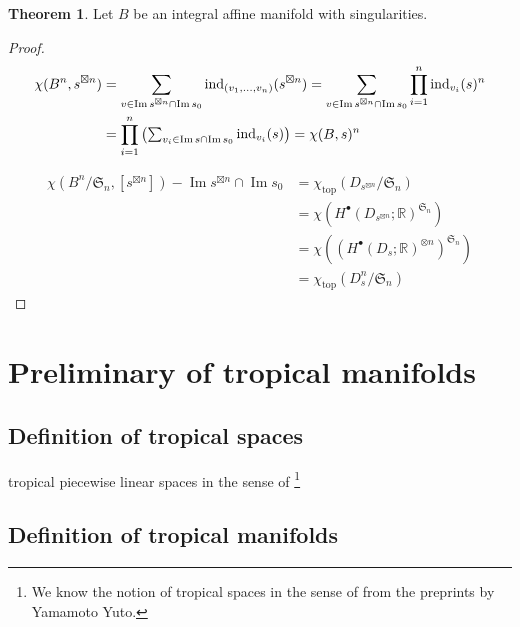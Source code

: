 \documentclass[a4paper,dvipdfmx,reqno,12pt]{amsart}
\theoremstyle{definition}
\newtheorem{Thm}{Theorem}[section]
\newcommand{\R}{\mathbb{R}}%
\newcommand{\mf}[1]{\mathfrak{#1}}%
\newcommand{\opn}[1]{\operatorname{#1}}
\numberwithin{equation}{section}
\begin{document}
\begin{Thm}
  Let $B$ be an integral affine manifold with singularities.



\end{Thm}
\begin{proof}

  \begin{align}
    \chi(B^{n},s^{\boxtimes n})
     & =\sum_{v\in \opn{Im}s^{\boxtimes n}\cap \opn{Im}s_0}
    \opn{ind}_{(v_1,\ldots,v_n)}(s^{\boxtimes n})
    =\sum_{v\in \opn{Im}s^{\boxtimes n}\cap \opn{Im}s_0}
    \prod_{i=1}^{n}\opn{ind}_{v_i}(s)^{n}                                                               \\
     & =\prod_{i=1}^{n}\mqty({\sum_{v_i\in \opn{Im}s\cap \opn{Im}s_0}\opn{ind}_{v_i}(s)})=\chi(B,s)^{n}
  \end{align}

  \begin{align}
    \chi(B^{n}/\mf{S}_n,[s^{\boxtimes n}])-\opn{Im}s^{\boxtimes n} \cap \opn{Im}s_0
     & = \chi_{\opn{top}}(D_{s^{\boxtimes n}}/\mf{S}_n)      \\
     & =\chi(H^{\bullet}(D_{s^{\boxtimes n}};\R)^{\mf{S}_n}) \\
     & =\chi((H^{\bullet}(D_s;\R)^{\otimes n})^{\mf{S}_n})   \\
     & =\chi_{\opn{top}}(D_s^{n}/\mf{S}_n)
  \end{align}

\end{proof}


\section{Preliminary of tropical manifolds}

\subsection{Definition of tropical spaces}
tropical piecewise linear spaces in the sense of \cite[Definition 2.1]{cavalieri2020tropical}
\footnote{We know the notion of tropical spaces
  in the sense of \cite[Definition 2.1]{cavalieri2020tropical} from the preprints by Yamamoto Yuto.}

\subsection{Definition of tropical manifolds}
\end{document}
